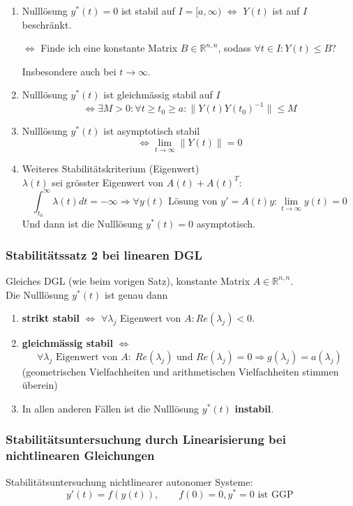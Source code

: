 \documentclass[a4paper]{article}
\newcommand{\R}{\mathbb{R}}
\begin{document}
\begin{enumerate}
	\item Nulllösung $y ^{*} (t) = 0$ ist stabil auf $I=[a, \infty)$
		$\Leftrightarrow$ $Y(t)$ ist auf $I$ beschränkt.
		
		$\Leftrightarrow$ Finde ich eine konstante Matrix $B \in \R ^{n,n}$,
		sodass $\forall t \in I: Y(t) \leq B$?

		Insbesondere auch bei $t \to \infty$.
	\item Nulllösung $y ^{*} (t)$ ist gleichmässig stabil auf $I$
		\[
		\Leftrightarrow \exists M > 0: \forall t \geq t_0 \geq a:
		\| Y(t) Y (t_0) ^{-1} \| \leq M
		\] 
	\item Nulllösung $y ^{*} (t)$ ist asymptotisch stabil
		\[
		\Leftrightarrow \lim_{t \to \infty} 
		\| Y(t) \| = 0
		\]
	\item Weiteres Stabilitätskriterium (Eigenwert)
		\\

		$\lambda (t)$ sei grösster Eigenwert von $A(t) + A(t) ^{T}$:
		\[
			\int_{t_0}^{\infty} \lambda (t) dt = - \infty 
			\Rightarrow \forall y(t) \text{ Lösung von }
			y' = A(t) y :
			\lim_{t \to \infty} y(t) = 0
		\] 
		Und dann ist die Nulllösung $y ^{*} (t) = 0$
		asymptotisch.
\end{enumerate}

\subsubsection{Stabilitätssatz 2 bei linearen DGL}
Gleiches DGL (wie beim vorigen Satz), konstante Matrix $A \in \R ^{n,n}$.
\\

Die Nulllösung $y ^{*} (t)$ ist genau dann
\begin{enumerate}
	\item \textbf{strikt stabil} $\Leftrightarrow$
		$\forall \lambda_j $ Eigenwert von $A: Re(\lambda_j) < 0$.
	\item \textbf{gleichmässig stabil} $\Leftrightarrow$
		\[
			\forall \lambda_j
			\text{ Eigenwert von }A : \;
			Re (\lambda_j)
			\text{ und }
			Re (\lambda_j) = 0
			\Rightarrow g( \lambda_j ) = a( \lambda_j )
		\] 
		(geometrischen Vielfachheiten und arithmetischen Vielfachheiten
		stimmen überein)
	\item In allen anderen Fällen ist die Nulllösung 
		$y ^{*} (t)$ \textbf{instabil}.
\end{enumerate}

\subsubsection{Stabilitätsuntersuchung durch Linearisierung bei nichtlinearen Gleichungen}
Stabilitätsuntersuchung nichtlinearer autonomer Systeme:
\[
	y' (t) = f(y(t)), \qquad 
	f(0) = 0, y ^{*} = 0
	\text{ ist GGP }
\] 
\end{document}
